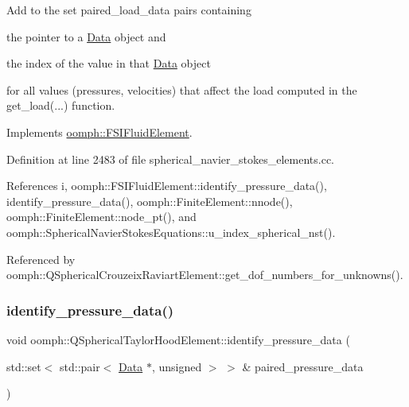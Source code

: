 Add to the set {\ttfamily paired\+\_\+load\+\_\+data} pairs containing
\begin{DoxyItemize}
\item the pointer to a \hyperlink{classoomph_1_1Data}{Data} object and
\item the index of the value in that \hyperlink{classoomph_1_1Data}{Data} object
\end{DoxyItemize}for all values (pressures, velocities) that affect the load computed in the {\ttfamily get\+\_\+load}(...) function. 

Implements \hyperlink{classoomph_1_1FSIFluidElement_a13c5f835cddd1b78e6d2582733619300}{oomph\+::\+F\+S\+I\+Fluid\+Element}.



Definition at line 2483 of file spherical\+\_\+navier\+\_\+stokes\+\_\+elements.\+cc.



References i, oomph\+::\+F\+S\+I\+Fluid\+Element\+::identify\+\_\+pressure\+\_\+data(), identify\+\_\+pressure\+\_\+data(), oomph\+::\+Finite\+Element\+::nnode(), oomph\+::\+Finite\+Element\+::node\+\_\+pt(), and oomph\+::\+Spherical\+Navier\+Stokes\+Equations\+::u\+\_\+index\+\_\+spherical\+\_\+nst().



Referenced by oomph\+::\+Q\+Spherical\+Crouzeix\+Raviart\+Element\+::get\+\_\+dof\+\_\+numbers\+\_\+for\+\_\+unknowns().

\mbox{\label{classoomph_1_1QSphericalTaylorHoodElement_a53b2b394a10a6a415a79c3d53aaf2a51}} 
\subsubsection{\texorpdfstring{identify\+\_\+pressure\+\_\+data()}{identify\_pressure\_data()}}
{\footnotesize\ttfamily void oomph\+::\+Q\+Spherical\+Taylor\+Hood\+Element\+::identify\+\_\+pressure\+\_\+data (\begin{DoxyParamCaption}\item[{std\+::set$<$ std\+::pair$<$ \hyperlink{classoomph_1_1Data}{Data} $\ast$, unsigned $>$ $>$ \&}]{paired\+\_\+pressure\+\_\+data }\end{DoxyParamCaption})\hspace{0.3cm}{\ttfamily [virtual]}}



